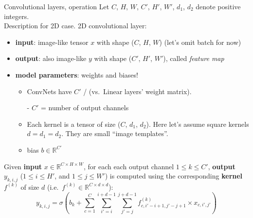 \begin{frame}{Convolutional layers, operation}
\vspace{-3mm}
Let $C$, $H$, $W$, $C'$, $H'$, $W'$, $d_{1}$, $d_{2}$ denote positive integers.\\
Description for 2D case. 2D convolutional layer:
\vsp
\begin{itemize}
\item \textbf{input}: image-like tensor $x$ with shape ($C$, $H$, $W$) (let's omit batch for now)
\item  \textbf{output}: also image-like $y$ with shape ($C'$, $H'$, $W'$), called \textit{feature map}
\item \textbf{model parameters}: weights and biases!
\begin{itemize}
\item ConvNets have $C'$ / (vs.~Linear layers' weight matrix).
\item[-] $C'$ = number of output channels
\item Each kernel is a tensor of size ($C$, $d_{1}$, $d_{2}$). Here let's assume square kernels $d=d_1=d_2$. They are small ``image templates''.
\item bias $b \in \mathbb{R}^{C'}$ 
\end{itemize}
\end{itemize}
\vsp
\vsp
\pause
 Given \textbf{input} $x \in \mathbb{R}^{C \times H \times W}$, for each each output channel $ 1 \leq k \leq C'$, \textbf{output} $y_{k, i, j}$ ($ 1 \leq i \leq H'$, and $ 1 \leq j \leq W'$) is computed using the corresponding \textbf{kernel} $f^{(k)}$ of size $d$ (i.e.\, $f^{(k)} \in \mathbb{R}^{C \times d \times d}$):
\[
y_{k, i, j} =  \sigma\left(b_{k} + \sum_{c=1}^{C} \sum_{i'=i}^{i+d-1} \sum_{j'=j}^{j+d-1} f^{(k)}_{c, i'-i+1, j'-j+1} \times x_{c, i', j'}\right)
\]
\end{frame}

